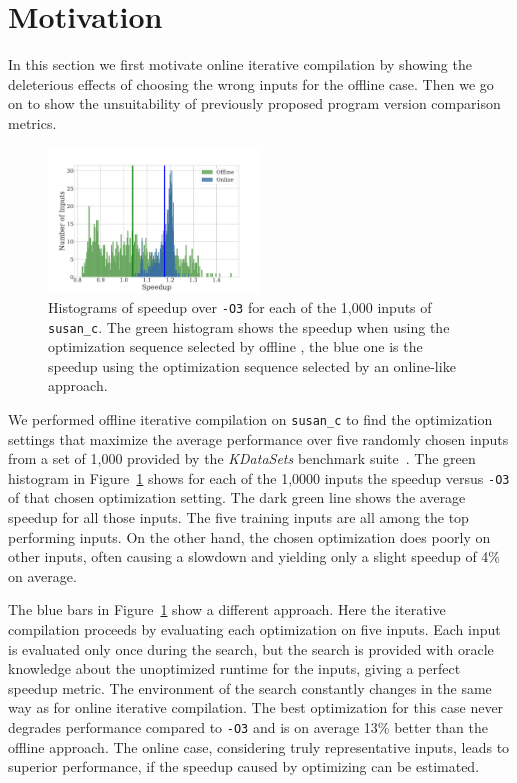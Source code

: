 \section{Motivation}

    In this section we first motivate online iterative compilation by showing the deleterious effects of choosing the wrong inputs for the
    offline case. Then we go on to show the unsuitability of previously proposed program version comparison metrics.

    \begin{figure}[t!]
        \centering
        \includegraphics[width=0.5\textwidth]{figs/motivation-online.pdf}
        \caption{
            Histograms of speedup over \texttt{-O3} for each of the 1,000 inputs of \texttt{susan\_c}. The green histogram shows the
            speedup when using the optimization sequence selected by offline \itercomp, the blue one is the speedup using the optimization
            sequence selected by an online-like approach. 
        }
        \label{fig:motivation-online}
    \end{figure}

    We performed offline iterative compilation on \texttt{susan\_c} to find the optimization settings that maximize the average performance
    over five randomly chosen inputs from a set of 1,000 provided by the \textit{KDataSets} benchmark suite~\cite{chen10,chen12a}.
    The green histogram in Figure~\ref{fig:motivation-online} shows for each of the 1,0000 inputs the speedup versus \texttt{-O3} of that
    chosen optimization setting. The dark green line shows the average speedup for all those inputs. The five training inputs are
    all among the top performing inputs. On the other hand, the chosen optimization does poorly on other inputs, often causing
    a slowdown and yielding only a slight speedup of 4\% on average.

    The blue bars in Figure~\ref{fig:motivation-online} show a different approach. Here the iterative compilation proceeds by evaluating
    each optimization on five inputs. Each input is evaluated only once during the search, but the search is provided with oracle
    knowledge about the unoptimized runtime for the inputs, giving a perfect speedup metric. The environment of the search constantly
    changes in the same way as for online iterative compilation. The best optimization for this case never degrades performance compared to
    \texttt{-O3} and is on average 13\% better than the offline approach. The online case, considering truly representative inputs, leads
    to superior performance, if the speedup caused by optimizing can be estimated.

